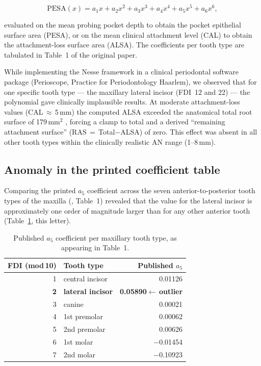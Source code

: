 \documentclass[11pt,a4paper]{article}
\begin{document}
\begin{equation}
\mathrm{PESA}(x) = a_1 x + a_2 x^2 + a_3 x^3 + a_4 x^4 + a_5 x^5 + a_6 x^6,
\end{equation}

evaluated on the mean probing pocket depth to obtain the pocket
epithelial surface area (PESA), or on the mean clinical attachment level
(CAL) to obtain the attachment-loss surface area (ALSA). The
coefficients per tooth type are tabulated in Table~1 of the original
paper.

While implementing the Nesse framework in a clinical periodontal
software package (Perioscope, Practice for Periodontology Haarlem), we
observed that for one specific tooth type --- the maxillary lateral
incisor (FDI~12 and 22) --- the polynomial gave clinically implausible
results. At moderate attachment-loss values (CAL\,$\approx$\,5\,mm) the
computed ALSA exceeded the anatomical total root surface of 179\,mm$^2$
\citep{Jepsen1963}, forcing a clamp to total and a derived ``remaining
attachment surface'' (RAS\,$=$\,Total$-$ALSA) of zero. This effect was
absent in all other tooth types within the clinically realistic AN range
(1--8\,mm).

\subsection*{Anomaly in the printed coefficient table}

Comparing the printed $a_5$ coefficient across the seven
anterior-to-posterior tooth types of the maxilla (\citealp{Nesse2008},
Table~1) revealed that the value for the lateral incisor is
approximately one order of magnitude larger than for any other anterior
tooth (Table~\ref{tab:anomaly}, this letter).

\begin{table}[h]
\centering
\caption{Published $a_5$ coefficient per maxillary tooth type, as
appearing in \citet{Nesse2008} Table~1.}
\label{tab:anomaly}
\begin{tabular}{rlr}
\toprule
FDI (mod\,10) & Tooth type & Published $a_5$ \\
\midrule
1 & central incisor & 0.01126 \\
\textbf{2} & \textbf{lateral incisor} & \textbf{0.05890\;$\leftarrow$\,outlier} \\
3 & canine & 0.00021 \\
4 & 1st premolar & 0.00062 \\
5 & 2nd premolar & 0.00626 \\
6 & 1st molar & $-$0.01454 \\
7 & 2nd molar & $-$0.10923 \\
\bottomrule
\end{tabular}
\end{table}
\end{document}
